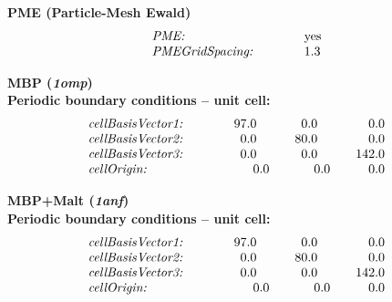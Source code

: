 \begin{itemize}
\begin{center}
\begin{minipage}{0.45\textwidth}
\begin{center}
\vspace{-1.55cm}
\textbf{PME (Particle-Mesh Ewald)}
\vspace{-0.25cm}
\begin{equation*}
\begin{array}{ll}
\text{\textit{PME:}} \qquad\quad & \text{yes}\\
\text{\textit{PMEGridSpacing:}} \qquad\quad & 1.3\\
\end{array}
\end{equation*}
\end{center}
\end{minipage}
\end{center}

\begin{center}
\textbf{MBP (\textit{1omp})\\Periodic boundary conditions -- unit cell:}
\vspace{-0.25cm}
\begin{equation*}
\begin{array}{lrrr}
\text{\textit{cellBasisVector1:}} \qquad\quad & 97.0 \qquad & 0.0 \qquad & 0.0\\
\text{\textit{cellBasisVector2:}} \qquad\quad & 0.0 \qquad & 80.0 \qquad & 0.0\\
\text{\textit{cellBasisVector3:}} \qquad\quad & 0.0 \qquad & 0.0 \qquad & 142.0\\
\text{\textit{cellOrigin:}} \qquad & 0.0 \quad & 0.0 \quad & 0.0\\
\end{array}
\end{equation*}

\textbf{MBP+Malt (\textit{1anf})\\Periodic boundary conditions -- unit cell:}
\vspace{-0.25cm}
\begin{equation*}
\begin{array}{lrrr}
\text{\textit{cellBasisVector1:}} \qquad\quad & 97.0 \qquad & 0.0 \qquad & 0.0\\
\text{\textit{cellBasisVector2:}} \qquad\quad & 0.0 \qquad & 80.0 \qquad & 0.0\\
\text{\textit{cellBasisVector3:}} \qquad\quad & 0.0 \qquad & 0.0 \qquad & 142.0\\
\text{\textit{cellOrigin:}} \qquad & 0.0 \quad & 0.0 \quad & 0.0\\
\end{array}
\end{equation*}
\end{center}


\end{itemize}
